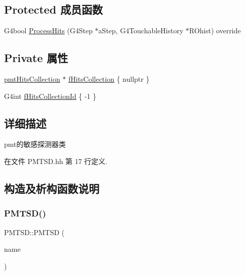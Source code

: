 \subsection*{Protected 成员函数}
\begin{DoxyCompactItemize}
\item 
G4bool \hyperlink{classPMTSD_ad901040792782721b858ac0a64a559bb}{Process\+Hits} (G4\+Step $\ast$a\+Step, G4\+Touchable\+History $\ast$R\+Ohist) override
\end{DoxyCompactItemize}
\subsection*{Private 属性}
\begin{DoxyCompactItemize}
\item 
\hyperlink{PMThit_8hh_a7f735d1ad0bfe8c6aa451ac6d58ffa57}{pmt\+Hits\+Collection} $\ast$ \hyperlink{classPMTSD_ad096abaafe714b508f14af1a2d3673b9}{f\+Hits\+Collection} \{ nullptr \}
\item 
G4int \hyperlink{classPMTSD_a2b3736dfb006ce9ca639b5008c91e6a5}{f\+Hits\+Collection\+Id} \{ -\/1 \}
\end{DoxyCompactItemize}


\subsection{详细描述}
pmt的敏感探测器类 

在文件 P\+M\+T\+S\+D.\+hh 第 17 行定义.



\subsection{构造及析构函数说明}
\mbox{\label{classPMTSD_aed89d4f48ef06debf8363e4ab5540e1e}} 
\subsubsection{\texorpdfstring{P\+M\+T\+S\+D()}{PMTSD()}}
{\footnotesize\ttfamily P\+M\+T\+S\+D\+::\+P\+M\+T\+SD (\begin{DoxyParamCaption}\item[{G4\+String}]{name }\end{DoxyParamCaption})}



